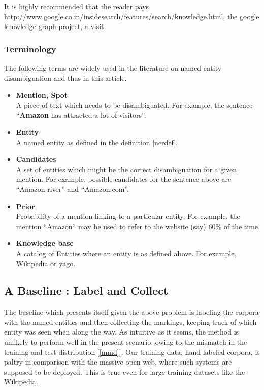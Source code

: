 It is highly recommended that the reader pays \url{http://www.google.co.in/insidesearch/features/search/knowledge.html}, 
the google knowledge graph project, a visit.


\subsubsection{Terminology}
The following terms are widely used in the literature on named entity disambiguation and thus in this article.

\begin{itemize}
 \item \textbf{Mention, Spot} \\
 A piece of text which needs to be disambiguated. For example, the sentence ``\textbf{Amazon} has attracted a lot of visitors''.
 \item \textbf{Entity} \\
 A named entity as defined in the definition \ref{nerdef}. 
 \item \textbf{Candidates} \\
 A set of entities which might be the correct disambiguation for a given mention.
 For example, possible candidates for the sentence above are ``Amazon river'' and ``Amazon.com''.
 \item \textbf{Prior} \\
 Probability of a mention linking to a particular entity. For example, the mention ``Amazon`` may be used
 to refer to the website (say) 60\% of the time.
 \item \textbf{Knowledge base} \\
 A catalog of Entities where an entity is as defined above. For example, Wikipedia or yago.

\end{itemize}

\subsection{A Baseline : Label and Collect}
The baseline which presents itself given the above problem is labeling the corpora with the named 
entities and then collecting the markings, keeping track of which entity was seen when along the way. 
As intuitive as it seems, the method is unlikely to perform well in the present scenario, owing to 
the mismatch in the training and test distribution [\ref{mmd}]. 
Our training data, hand labeled corpora, is paltry in comparison with the massive open web, where such 
systems are supposed to be deployed. This is true even for large training datasets like the Wikipedia.

